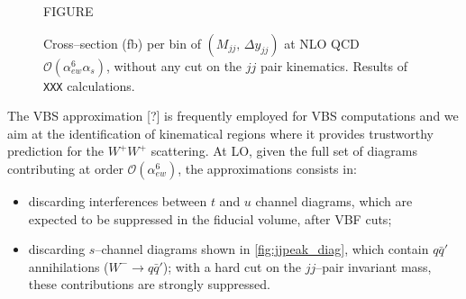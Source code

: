 

\begin{figure}[hbt]
\centering
FIGURE
\caption{Cross--section (fb) per bin of $(M_{jj},\,\Delta y_{jj})$ at NLO QCD $\mathcal{O}(\alpha_{ew}^6\alpha_s)$, without any cut on the $jj$ pair kinematics. Results of \texttt{XXX} calculations.}\label{fig:mjjdyjj_2d_NLO}
\end{figure}
\newpage


The VBS approximation [?] is frequently employed for VBS computations and we aim at the identification of kinematical regions where it provides trustworthy prediction for the $W^+W^+$ scattering.
At LO, given the full set of diagrams contributing at order $\mathcal{O}(\alpha_{ew}^6)$, the approximations consists in:
\begin{itemize}
\item discarding interferences between $t$ and $u$ channel diagrams, which are expected to be suppressed in the fiducial volume, after VBF cuts;
\item discarding $s$--channel diagrams shown in \autoref{fig:jjpeak_diag}, which contain $q\bar{q}'$ annihilations ($W^-\rightarrow q \bar{q}'$); with a hard cut on the $jj$--pair invariant mass, these contributions are strongly suppressed.
\end{itemize}

